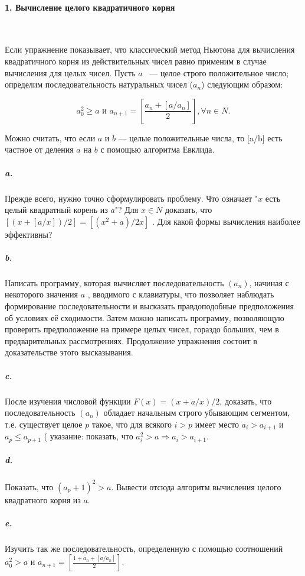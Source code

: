 \paragraph { 1. Вычисление целого квадратичного корня}\ \newline

Если упражнение показывает, что классический метод Ньютона для вычисления квадратичного корня из действительных чисел равно применим в случае вычисления для целых чисел. Пусть $a$ ~--- целое строго положительное число; определим последовательность натуральных чисел ($a_{n}$) следующим образом: 

\begin{equation*}
a_0^2 \geqslant {a}  \text{    и     }  a_{n+1} = \left[\frac{a_n+\left[a/a_n\right]}{2}\right], \forall{n} \in {N}.
\end{equation*}

Можно считать, что если $a$ и $b$ --- целые положительные  числа, то [a/b] есть частное от деления $a$ на $b$ с помощью алгоритма Евклида. 

\subparagraph { a.}  Прежде всего, нужно точно сформулировать проблему. Что означает "$x$ есть целый квадратный корень из $a$"?
Для $x \in{N}$ доказать, что $\left[\left(x+\left[a/x\right]\right)/2\right]=\left[\left(x^{2}+a\right)/2x\right]$ . Для какой формы вычисления наиболее эффективны? 

\subparagraph {b.} Написать программу, которая вычисляет последовательность $(a_{n})$, начиная с некоторого значения $a$ , вводимого с клавиатуры, что позволяет наблюдать формирование последовательности и высказать правдоподобные предположения об условиях её сходимости. Затем можно написать программу, позволяющую проверить предположение на примере целых чисел, гораздо больших, чем в предварительных рассмотрениях. Продолжение упражнения состоит в доказательстве этого высказывания.

\subparagraph { c.} После изучения числовой функции $F\left(x\right)=\left(x+a/x\right)/2$, доказать, что последовательность $\left(a_{n}\right)$ обладает начальным строго убывающим сегментом, т.е. существует  целое $p$ такое, что для всякого $i>p$ имеет место $a_{i}>a_{i+1}$ и $a_{p}\leq{a_{p+1}}$ ( указание: показать, что $a_i^2>a\Rightarrow{a_{i}>a_{i+1}}$.

\subparagraph {d.} Показать, что  $\left(a_p+1\right)^2>a$. Вывести отсюда алгоритм вычисления целого квадратного корня из $a$. 

\subparagraph {e.} Изучить так же последовательность, определенную с помощью соотношений $a_0^2>a$  и 
$ a_{n+1} = \left[\frac{1+a_{n}+\left[a/a_{n}\right]}{2}\right]$.

